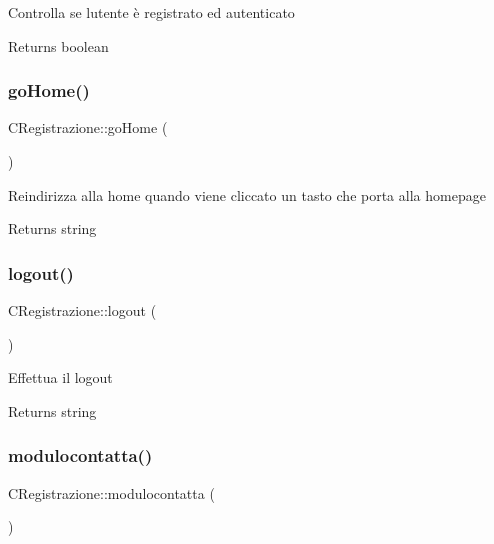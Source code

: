 Controlla se l\textquotesingle{}utente è registrato ed autenticato

\begin{DoxyReturn}{Returns}
boolean 
\end{DoxyReturn}
\mbox{\label{class_c_registrazione_a314d300147605fbd772a5f9ca22d4c35}} 
\subsubsection{\texorpdfstring{go\+Home()}{goHome()}}
{\footnotesize\ttfamily C\+Registrazione\+::go\+Home (\begin{DoxyParamCaption}{ }\end{DoxyParamCaption})}

Reindirizza alla home quando viene cliccato un tasto che porta alla homepage

\begin{DoxyReturn}{Returns}
string 
\end{DoxyReturn}
\mbox{\label{class_c_registrazione_a32d91897b6558bf53694479719b99195}} 
\subsubsection{\texorpdfstring{logout()}{logout()}}
{\footnotesize\ttfamily C\+Registrazione\+::logout (\begin{DoxyParamCaption}{ }\end{DoxyParamCaption})}

Effettua il logout

\begin{DoxyReturn}{Returns}
string 
\end{DoxyReturn}
\mbox{\label{class_c_registrazione_a915ca538df41be1b1ec64476d35cef91}} 
\subsubsection{\texorpdfstring{modulocontatta()}{modulocontatta()}}
{\footnotesize\ttfamily C\+Registrazione\+::modulocontatta (\begin{DoxyParamCaption}{ }\end{DoxyParamCaption})}

